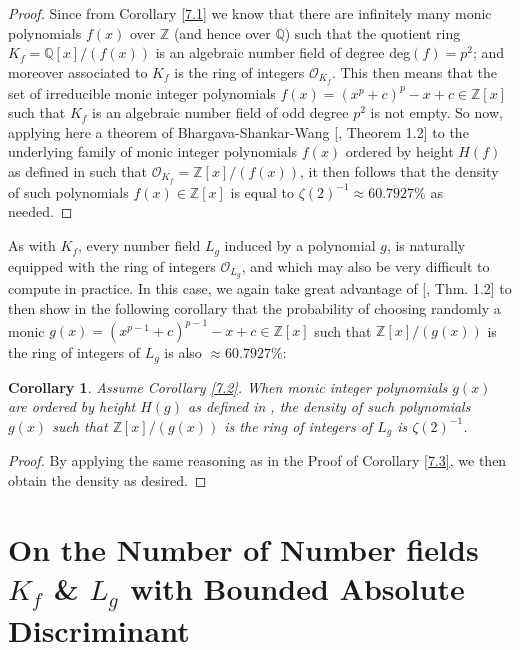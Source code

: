 \documentclass{article}
\theoremstyle{plain}
\newtheorem{cor}[thm]{Corollary}
\theoremstyle{definition}
\begin{document}
\begin{proof}
Since from Corollary \ref{7.1} we know that there are infinitely many monic polynomials $f(x)$ over $\mathbb{Z}$ (and hence over $\mathbb{Q}$) such that the quotient ring $K_{f} = \mathbb{Q}[x]\slash (f(x))$ is an algebraic number field of degree deg$(f) = p^2$; and moreover associated to $K_{f}$ is the ring of integers $\mathcal{O}_{K_{f}}$. This then means that the set of irreducible monic integer polynomials $f(x)=(x^p+c)^p-x+c\in \mathbb{Z}[x]$ such that $K_{f}$ is an algebraic number field of odd degree $p^2$ is not empty. So now, applying here a theorem of Bhargava-Shankar-Wang [\cite{sch1}, Theorem 1.2] to the underlying family of monic integer polynomials $f(x)$ ordered by height $H(f)$ as defined in \cite{sch1} such that $\mathcal{O}_{K_{f}} = \mathbb{Z}[x]\slash (f(x))$, it then follows that the density of such polynomials $f(x)\in \mathbb{Z}[x]$ is equal to $\zeta(2)^{-1} \approx 60.7927\%$ as needed.
\end{proof}

As with $K_{f}$, every number field $L_{g}$ induced by a polynomial $g$, is naturally equipped with the ring of integers $\mathcal{O}_{L_{g}}$, and which may also be very difficult to compute in practice. In this case, we again take great advantage of [\cite{sch1}, Thm. 1.2] to then show in the following corollary that the probability of choosing randomly a monic $g(x)=(x^{p-1}+c)^{p-1}-x+c\in \mathbb{Z}[x]$ such that $\mathbb{Z}[x]\slash (g(x))$ is the ring of integers of $L_{g}$ is also $\approx 60.7927\%$:

\begin{cor}
Assume Corollary \ref{7.2}. When monic integer polynomials $g(x)$ are ordered by height $H(g)$ as defined in \textnormal{\cite{sch1}}, the density of such polynomials $g(x)$ such that $\mathbb{Z}[x]\slash (g(x))$ is the ring of integers of $L_{g}$ is $\zeta(2)^{-1}$. 
\end{cor}

\begin{proof}
By applying the same reasoning as in the Proof of Corollary \ref{7.3}, we then obtain the density as desired.
\end{proof}

\section{On the Number of Number fields $K_{f}$ \& $L_{g}$ with Bounded Absolute Discriminant}\label{sec8}
\end{document}
